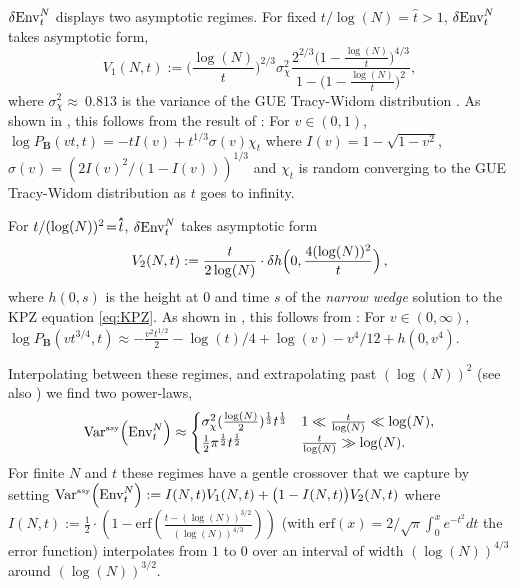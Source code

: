 $\var{\mathrm{Env}^{N}_t}$ displays two asymptotic regimes. For fixed $t/\log(N)=\hat{t}>1$, $\var{\mathrm{Env}^{N}_t}$ takes  asymptotic form,
\begin{equation}\label{eqlogN}
V_1(N, t):=\Big(\frac{\log(N)}{t}\Big)^{2/3} \sigma_{\chi}^2 \frac{2^{2/3}\big(1-\frac{\log(N)}{t}\big)^{4/3}}{1- \big(1- \frac{\log (N)}{t}\big)^2},
\end{equation}
where $\sigma_{\chi}^2\approx~0.813$ is the variance of the GUE Tracy-Widom distribution \cite{prahofer_universal_2000, tracy_level-spacing_1993}. As shown in \cite{SeeSupplementalMaterial}, this follows from the result of \cite{barraquand_random-walk_2017}: For $v\in(0,1)$, $\log P_\mathbf{B}(vt,t)=-t I(v) + t^{1/3} \sigma(v)\chi_t$ where $I(v) = 1-\sqrt{1-v^2}$, $\sigma(v) = (2I(v)^2/(1-I(v)))^{1/3}$ and $\chi_t$ is random converging to the GUE Tracy-Widom distribution as $t$ goes to infinity.

For $t/(\log(N))^2\!=\!\hathat{t}$,  $\var{\mathrm{Env}^{N}_t}$ takes asymptotic form
\begin{equation}\label{eqlogNsq}
V_2(N, t):=\frac{t}{2\log(N)} \cdot \var{h\Big(0,\frac{4 (\log(N))^2}{t}\Big)},
\end{equation}
where $h(0,s)$ is the height at $0$ and time $s$ of the {\it narrow wedge} solution to the KPZ equation \eqref{eq:KPZ}. As shown in \cite{SeeSupplementalMaterial}, this follows from \cite{barraquand_moderate_2020}: For $v\in (0,\infty)$,
$
\log P_\mathbf{B}(vt^{3/4},t) \approx -\frac{v^2t^{1/2}}{2} -\log(t)/4+\log(v) - v^4/12 + h(0,v^4).
$

Interpolating between these regimes, and extrapolating past $(\log(N))^2$ (see also \cite{krajenbrink_crossover_2022}) we find two power-laws,
\begin{equation}\label{eq:varqnt}
\mathrm{Var}^{\textrm{\tiny{asy}}}\!\left(\mathrm{Env}^{N}_t\right) \approx
    \begin{cases}
    \sigma_{\chi}^2 (\frac{\log(N)}{2})^{\frac{1}{3}} t^{\frac{1}{3}}& 1 \ll \frac{t}{\log(N)}\ll \log(N),\\
    \frac{1}{2}\pi^{\frac{1}{2}} t^{\frac{1}{2}}& \frac{t}{\log(N)}\gg \log(N).
    \end{cases}
\end{equation}
For finite $N$ and $t$ these regimes have a gentle crossover that we capture by setting
$
\mathrm{Var}^{\textrm{\tiny{asy}}}\!\left(\mathrm{Env}^{N}_t\right) := I(N,t) V_1(N, t)+\big(1-I(N,t)\big) V_2(N, t)
$
where $I(N,t) := \frac{1}{2} \cdot \left(1-\text{erf}\left(\frac{t-(\log(N))^{3/2}}{(\log(N))^{4/3}}\right)\right)$ (with  $\text{erf}(x)= 2/\sqrt{\pi} \int_{0}^{x} e^{-t^2}dt$ the error function) interpolates from $1$ to $0$ over an interval of width $(\log(N))^{4/3}$ around $(\log(N))^{3/2}$.


